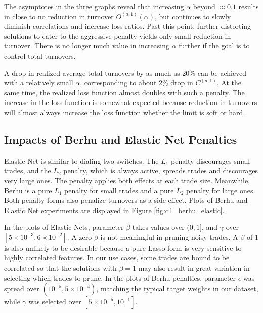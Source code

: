 \documentclass[11pt, letterpaper]{article}
\begin{document}
The asymptotes in the three graphs reveal that increasing $\alpha$ beyond $\approx 0.1$ results in close to no reduction in
turnover $O^{(a,1)}(\alpha)$, but continues to slowly diminish correlations and increase loss ratios. Past this point, further
distorting solutions to cater to the aggressive penalty yields only small reduction in turnover. There is no longer much value
in increasing $\alpha$ further if the goal is to control total turnovers.

A drop in realized average total turnovers by as much as 20\% can be achieved with a relatively small $\alpha$, corresponding to
about 2\% drop in $C^{(a,1)}$. At the same time, the realized loss function almost doubles with such a penalty. The increase in
the loss function is somewhat expected because reduction in turnovers will almost always increase the loss function whether the
limit is soft or hard.

\subsection{Impacts of Berhu and Elastic Net Penalties}
Elastic Net is similar to dialing two switches. The $L_1$ penalty discourages small trades, and the $L_2$ penalty, which is
always active, spreads trades and discourages very large ones. The penalty applies both effects at each trade size. Meanwhile,
Berhu is a pure $L_1$ penalty for small trades and a pure $L_2$ penalty for large ones. Both penalty forms also penalize
turnovers as a side effect. Plots of Berhu and Elastic Net experiments are displayed in Figure \ref{fig:d1_berhu_elastic}.

In the plots of Elastic Nets, parameter $\beta$ takes values over $(0,1]$, and $\gamma$ over
$[5 \times 10^{-3}, 6 \times 10^{-2}]$. A zero $\beta$ is not meaningful in pruning noisy trades. A $\beta$ of 1 is also
unlikely to be desirable because a pure Lasso form is very sensitive to highly correlated features. In our use cases, some
trades are bound to be correlated so that the solutions with $\beta=1$ may also result in great variation in selecting which
trades to prune. In the plots of Berhu penalties, parameter $\epsilon$ was spread over $(10^{-5}, 5 \times 10^{-4})$, matching
the typical target weights in our dataset, while $\gamma$ was selected over $[5 \times 10^{-5},10^{-1}]$.
\end{document}
